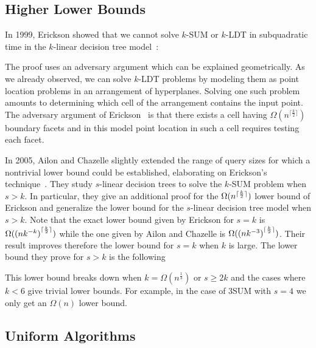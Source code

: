 \subsection{Higher Lower Bounds}

In 1999, Erickson showed that we cannot solve \(k\)-SUM or
\(k\)-LDT in subquadratic time in the \(k\)-linear decision tree
model~\cite{Er99a}:
%

%
The proof uses an adversary argument which can be explained geometrically. As
we already observed, we can solve \(k\)-LDT problems by modeling them as point
location problems in an arrangement of hyperplanes. Solving one such problem
amounts to determining which cell of the arrangement contains the input point.
The adversary argument of Erickson~\cite{Er99a} is that there exists a cell having
$\Omega(n^{\lceil\frac{k}{2}\rceil})$ boundary facets and in this model point
location in such a cell requires testing each facet.



In 2005, Ailon and Chazelle slightly extended the range of query sizes for
which a nontrivial lower bound could be established, elaborating on Erickson's
technique~\cite{AC05}.
%
They study \(s\)-linear decision trees to solve the \(k\)-SUM problem when
\(s > k\). In particular, they give an additional proof for the
$\Omega(n^{\lceil\frac{k}{2}\rceil})$ lower bound of Erickson and
generalize the lower bound for the \(s\)-linear decision tree model when \(s >
k\). Note that the exact lower bound given by Erickson for \(s = k\) is
$\Omega({(nk^{-k})}^{\lceil\frac{k}{2}\rceil})$ while the one given by
Ailon and Chazelle is $\Omega({(nk^{-3})}^{\lceil\frac{k}{2}\rceil})$. Their result
improves therefore the lower bound for \(s = k\) when \(k\) is large.
The lower bound they prove for \(s > k\) is the following
%

%
This lower bound breaks down when
\(k = \Omega(n^{\frac{1}{3}})\) or \(s \ge 2 k\) and the cases where \(k < 6\)
give trivial lower bounds. For example, in the case
of 3SUM with \(s = 4\) we only get an $\Omega(n)$ lower bound.

\subsection{Uniform Algorithms}%
\label{sec:problem:sum:uniform-algorithms}

